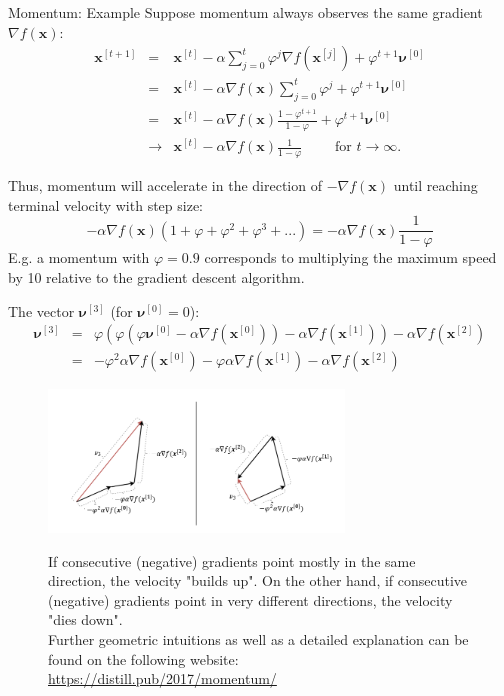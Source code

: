 \documentclass[11pt,compress,t,notes=noshow, xcolor=table]{beamer}
\begin{document}
\begin{vbframe}{Momentum: Example}
	Suppose momentum always observes the same gradient $ \nabla f(\bm{x})$:
	\footnotesize 
	\begin{eqnarray*}
		\bm{x}^{[t+1]} &=& \bm{x}^{[t]} - \alpha \displaystyle\sum_{j = 0}^{t} \varphi^j  \nabla f(\bm{x}^{[j]}) + \varphi^{t+1}\bm{\nu}^{[0]} \\
		&=& \bm{x}^{[t]} - \alpha  \nabla f(\bm{x}) \displaystyle\sum_{j = 0}^{t} \varphi^j + \varphi^{t+1}\bm{\nu}^{[0]} \\
		&=& \bm{x}^{[t]} - \alpha  \nabla f(\bm{x}) \frac{1 - \varphi^{t+1}}{1 - \varphi} + \varphi^{t+1} \bm{\nu}^{[0]} \\
		&\to& \bm{x}^{[t]} - \alpha  \nabla f(\bm{x}) \frac{1}{1 - \varphi} \qquad \text{ for } t \to \infty. 
	\end{eqnarray*}
	
	Thus, momentum will accelerate in the direction of $- \nabla f(\bm{x})$ until reaching terminal velocity with step size: 
	$$-\alpha  \nabla f(\bm{x})(1 + \varphi + \varphi^2 + \varphi^3 + ...) = -\alpha  \nabla f(\bm{x}) \frac{1}{1 - \varphi}$$
	E.g. a momentum with $\varphi = 0.9$ corresponds to multiplying the maximum speed by 10 relative to the gradient descent algorithm. 

\framebreak
The vector $\bm{\nu}^{[3]}$ (for $\bm{\nu}^{[0]} = 0$): 
 	\begin{eqnarray*}
 	\bm{\nu}^{[3]} &=& \varphi (\varphi (\varphi \bm{\nu}^{[0]} - \alpha \nabla f(\bm{x}^{[0]})) - \alpha \nabla f(\bm{x}^{[1]})) - \alpha \nabla f(\bm{x}^{[2]}) \\
 	&=& - \varphi^2\alpha\nabla f(\bm{x}^{[0]}) - \varphi \alpha \nabla f(\bm{x}^{[1]}) - \alpha \nabla f(\bm{x}^{[2]})
 	\end{eqnarray*}
 
 \vspace*{-0.2cm}
  \begin{figure}
  \centering
    \includegraphics[width = 0.7\textwidth]{figure_man/momentum_vectors.png} \\
    \begin{footnotesize}
    	If consecutive (negative) gradients point mostly in the same direction, the velocity "builds up". On the other hand, if consecutive (negative) gradients point in very different directions, the velocity "dies down". \\
    	Further geometric intuitions as well as a detailed explanation can be found on the following website:
      \url{https://distill.pub/2017/momentum/}
    \end{footnotesize}
  \end{figure}


\end{vbframe}
\end{document}
